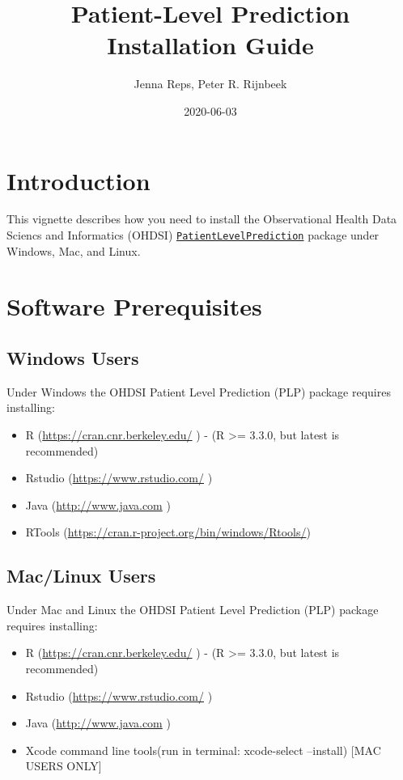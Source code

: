 \documentclass[
]{article}
\title{Patient-Level Prediction Installation Guide}
\author{Jenna Reps, Peter R. Rijnbeek}
\date{2020-06-03}
\providecommand{\tightlist}{%
  \setlength{\itemsep}{0pt}\setlength{\parskip}{0pt}}
\begin{document}
\maketitle

{
\setcounter{tocdepth}{2}
\tableofcontents
}
\hypertarget{introduction}{%
\section{Introduction}\label{introduction}}

This vignette describes how you need to install the Observational Health
Data Sciencs and Informatics (OHDSI)
\href{http://github.com/OHDSI/PatientLevelPrediction}{\texttt{PatientLevelPrediction}}
package under Windows, Mac, and Linux.

\hypertarget{software-prerequisites}{%
\section{Software Prerequisites}\label{software-prerequisites}}

\hypertarget{windows-users}{%
\subsection{Windows Users}\label{windows-users}}

Under Windows the OHDSI Patient Level Prediction (PLP) package requires
installing:

\begin{itemize}
\tightlist
\item
  R (\url{https://cran.cnr.berkeley.edu/} ) - (R \textgreater= 3.3.0,
  but latest is recommended)
\item
  Rstudio (\url{https://www.rstudio.com/} )
\item
  Java (\url{http://www.java.com} )
\item
  RTools (\url{https://cran.r-project.org/bin/windows/Rtools/})
\end{itemize}

\hypertarget{maclinux-users}{%
\subsection{Mac/Linux Users}\label{maclinux-users}}

Under Mac and Linux the OHDSI Patient Level Prediction (PLP) package
requires installing:

\begin{itemize}
\tightlist
\item
  R (\url{https://cran.cnr.berkeley.edu/} ) - (R \textgreater= 3.3.0,
  but latest is recommended)
\item
  Rstudio (\url{https://www.rstudio.com/} )
\item
  Java (\url{http://www.java.com} )
\item
  Xcode command line tools(run in terminal: xcode-select --install)
  {[}MAC USERS ONLY{]}
\end{itemize}
\end{document}
